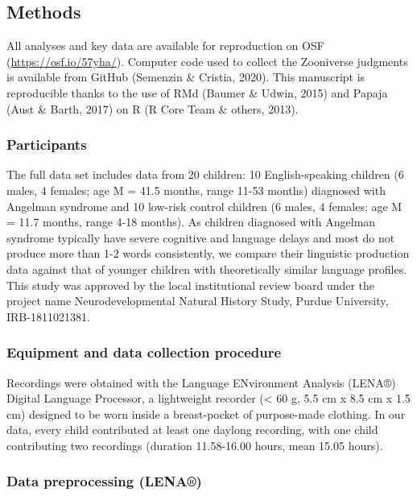 \documentclass[
  english,
  ,man]{apa6}
\begin{document}
\hypertarget{methods}{%
\subsection{Methods}\label{methods}}

All analyses and key data are available for reproduction on OSF (\url{https://osf.io/57yha/}). Computer code used to collect the Zooniverse judgments is available from GitHub (Semenzin \& Cristia, 2020). This manuscript is reproducible thanks to the use of RMd (Baumer \& Udwin, 2015) and Papaja (Aust \& Barth, 2017) on R (R Core Team \& others, 2013).

\hypertarget{participants}{%
\subsubsection{Participants}\label{participants}}

The full data set includes data from 20 children: 10 English-speaking children (6 males, 4 females; age M = 41.5 months, range 11-53 months) diagnosed with Angelman syndrome and 10 low-risk control children (6 males, 4 females; age M = 11.7 months, range 4-18 months). As children diagnosed with Angelman syndrome typically have severe cognitive and language delays and most do not produce more than 1-2 words consistently, we compare their linguistic production data against that of younger children with theoretically similar language profiles. This study was approved by the local institutional review board under the project name Neurodevelopmental Natural History Study, Purdue University, IRB-1811021381.

\hypertarget{equipment-and-data-collection-procedure}{%
\subsubsection{Equipment and data collection procedure}\label{equipment-and-data-collection-procedure}}

Recordings were obtained with the Language ENvironment Analysis (LENA®) Digital Language Processor, a lightweight recorder (\textless{} 60 g, 5.5 cm x 8.5 cm x 1.5 cm) designed to be worn inside a breast-pocket of purpose-made clothing. In our data, every child contributed at least one daylong recording, with one child contributing two recordings (duration 11.58-16.00 hours, mean 15.05 hours).

\hypertarget{data-preprocessing-lena}{%
\subsubsection{Data preprocessing (LENA®)}\label{data-preprocessing-lena}}
\end{document}
